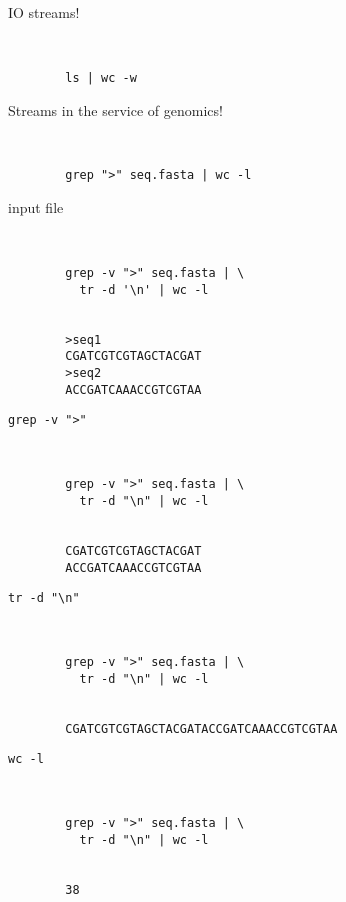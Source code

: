 \documentclass[xcolor=dvipsnames]{beamer}
\begin{document}
\begin{frame}[fragile]
	\huge
	IO streams!
	\Large
	\begin{verbatim}
		
	
		ls | wc -w
	\end{verbatim}
\end{frame}

\begin{frame}[fragile]
	\huge
	Streams in the service of genomics!
	\Large
	\begin{verbatim}
		
	
		grep ">" seq.fasta | wc -l
	\end{verbatim}
\end{frame}

\begin{frame}[fragile]
	\huge
	input file
	\Large
	\begin{verbatim}
		
	
		grep -v ">" seq.fasta | \
		  tr -d '\n' | wc -l
		
		
		>seq1
		CGATCGTCGTAGCTACGAT
		>seq2
		ACCGATCAAACCGTCGTAA
	\end{verbatim}
\end{frame}

\begin{frame}[fragile]
	\huge
	\verb!grep -v ">"!
	\Large
	\begin{verbatim}
		
	
		grep -v ">" seq.fasta | \
		  tr -d "\n" | wc -l
		
		
		CGATCGTCGTAGCTACGAT
		ACCGATCAAACCGTCGTAA
	\end{verbatim}
\end{frame}

\begin{frame}[fragile]
	\huge
	\verb!tr -d "\n"!
	\Large
	\begin{verbatim}
		
	
		grep -v ">" seq.fasta | \
		  tr -d "\n" | wc -l
		
		
		CGATCGTCGTAGCTACGATACCGATCAAACCGTCGTAA
	\end{verbatim}
\end{frame}

\begin{frame}[fragile]
	\huge
	\verb!wc -l!
	\Large
	\begin{verbatim}
		
	
		grep -v ">" seq.fasta | \
		  tr -d "\n" | wc -l
		
		
		38
	\end{verbatim}
\end{frame}
\end{document}
